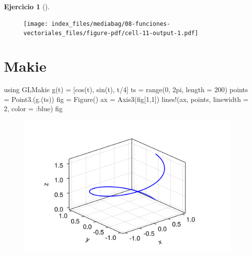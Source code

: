 \documentclass[
  a4paper,
]{scrreport}
\newenvironment{Shaded}{\begin{snugshade}}{\end{snugshade}}
\newcommand{\BuiltInTok}[1]{\textcolor[rgb]{0.00,0.23,0.31}{#1}}
\newcommand{\FloatTok}[1]{\textcolor[rgb]{0.68,0.00,0.00}{#1}}
\newcommand{\FunctionTok}[1]{\textcolor[rgb]{0.28,0.35,0.67}{#1}}
\newcommand{\ImportTok}[1]{\textcolor[rgb]{0.00,0.46,0.62}{#1}}
\newcommand{\NormalTok}[1]{\textcolor[rgb]{0.00,0.23,0.31}{#1}}
\newcommand{\OperatorTok}[1]{\textcolor[rgb]{0.37,0.37,0.37}{#1}}
\theoremstyle{definition}
\newtheorem{exercise}{Ejercicio}[chapter]
\theoremstyle{remark}
\begin{document}
\begin{exercise}[]
\begin{enumerate}
\begin{tcolorbox}
  \begin{figure}[H]

  {\centering \texttt{[image: index\_files/mediabag/08-funciones-vectoriales\_files/figure-pdf/cell-11-output-1.pdf]}

  }

  \end{figure}

  \section{Makie}

\begin{Shaded}
\begin{Highlighting}[]
\ImportTok{using} \BuiltInTok{GLMakie}
\FunctionTok{g}\NormalTok{(t) }\OperatorTok{=}\NormalTok{ [}\FunctionTok{cos}\NormalTok{(t), }\FunctionTok{sin}\NormalTok{(t), t}\OperatorTok{/}\FloatTok{4}\NormalTok{] }
\NormalTok{ts }\OperatorTok{=} \FunctionTok{range}\NormalTok{(}\FloatTok{0}\NormalTok{, }\FloatTok{2}\NormalTok{pi, length }\OperatorTok{=} \FloatTok{200}\NormalTok{)}
\NormalTok{points }\OperatorTok{=} \FunctionTok{Point3}\NormalTok{.(}\FunctionTok{g}\NormalTok{.(ts))}
\NormalTok{fig }\OperatorTok{=} \FunctionTok{Figure}\NormalTok{()}
\NormalTok{ax }\OperatorTok{=} \FunctionTok{Axis3}\NormalTok{(fig[}\FloatTok{1}\NormalTok{,}\FloatTok{1}\NormalTok{])}
\FunctionTok{lines!}\NormalTok{(ax, points, linewidth }\OperatorTok{=} \FloatTok{2}\NormalTok{, color }\OperatorTok{=} \OperatorTok{:}\NormalTok{blue)}
\NormalTok{fig}
\end{Highlighting}
\end{Shaded}

  \begin{figure}[H]

  {\centering \includegraphics{08-funciones-vectoriales_files/figure-pdf/cell-12-output-1.png}

  }

  \end{figure}

  \end{tcolorbox}
\end{enumerate}

\end{exercise}
\end{document}
